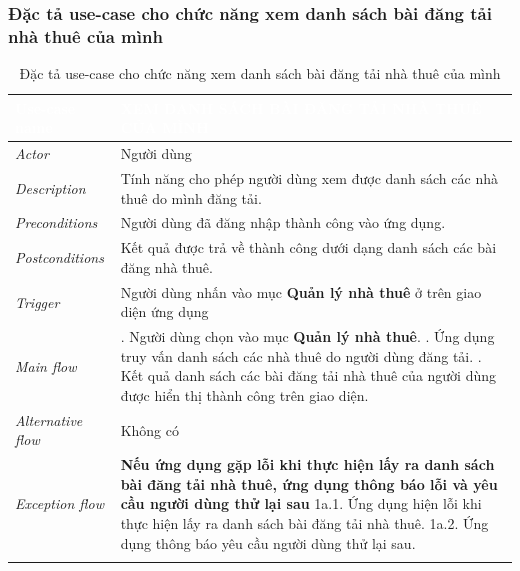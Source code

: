 \subsubsection{Đặc tả use-case cho chức năng xem danh sách bài đăng tải nhà thuê của mình}
\begin{center}
    \arrayrulewidth=2pt
    \begin{longtable}{
        |>{\raggedright\arraybackslash}p{3cm}
        |>{\raggedright\arraybackslash}p{13cm}
        |}
        \hline
        \rowcolor{cyan!75!black} \textcolor{white}{\textbf{Use-case name}} & \textcolor{white}{\textbf{XEM DANH SÁCH BÀI ĐĂNG TẢI NHÀ THUÊ CỦA MÌNH}}
        \\\hline
        \rowcolor{cyan!10!white} \textit{Actor} & Người dùng
        \\\hdashline
        \rowcolor{cyan!10!white} \textit{Description} & Tính năng cho phép người dùng xem được danh sách các nhà thuê do mình đăng tải.
        \\\hdashline
        \rowcolor{cyan!10!white} \textit{Preconditions} & Người dùng đã đăng nhập thành công vào ứng dụng.
        \\\hdashline
        \rowcolor{cyan!10!white} \textit{Postconditions} & Kết quả được trả về thành công dưới dạng danh sách các bài đăng nhà thuê.
        \\\hdashline
        \rowcolor{cyan!10!white} \textit{Trigger} & Người dùng nhấn vào mục \textbf{Quản lý nhà thuê} ở trên giao diện ứng dụng
        \\\hdashline
        \rowcolor{cyan!10!white} \textit{Main flow} &
        1. Người dùng chọn vào mục \textbf{Quản lý nhà thuê}. \newline
        2. Ứng dụng truy vấn danh sách các nhà thuê do người dùng đăng tải. \newline
        3. Kết quả danh sách các bài đăng tải nhà thuê của người dùng được hiển thị thành công trên giao diện.
        \\\hdashline
        \rowcolor{cyan!10!white} \textit{Alternative flow} & Không có
        \\\hdashline
        \rowcolor{cyan!10!white} \textit{Exception flow} &
        \textbf{Nếu ứng dụng gặp lỗi khi thực hiện lấy ra danh sách bài đăng tải nhà thuê, ứng dụng thông báo lỗi và yêu cầu người dùng thử lại sau} \newline
        1a.1. Ứng dụng hiện lỗi khi thực hiện lấy ra danh sách bài đăng tải nhà thuê. \newline
        1a.2. Ứng dụng thông báo yêu cầu người dùng thử lại sau.
        \\\hline
        \caption{Đặc tả use-case cho chức năng xem danh sách bài đăng tải nhà thuê của mình}
    \end{longtable}
\end{center}

